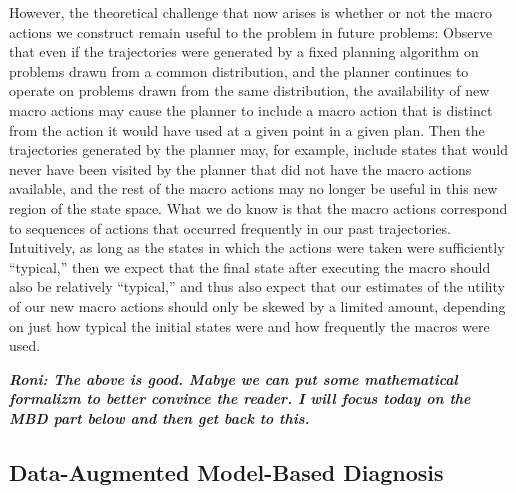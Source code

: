 \documentclass[12pt]{article}
\newcommand{\note}[1]{\textbf{\textit{#1}}}
\begin{document}
However, the theoretical challenge that now arises is whether or not the macro actions we construct remain useful to the problem in future problems: Observe that even if the trajectories were generated by a fixed planning algorithm on problems drawn from a common distribution, and the planner continues to operate on problems drawn from the same distribution, the availability of new macro actions may cause the planner to include a macro action that is distinct from the action it would have used at a given point in a given plan. Then the trajectories generated by the planner may, for example, include states that would never have been visited by the planner that did not have the macro actions available, and the rest of the macro actions may no longer be useful in this new region of the state space. What we do know is that the macro actions correspond to sequences of actions that occurred frequently in our past trajectories. Intuitively, as long as the states in which the actions were taken were sufficiently ``typical,'' then we expect that the final state after executing the macro should also be relatively ``typical,'' and thus also expect that our estimates of the utility of our new macro actions should only be skewed by a limited amount, depending on just how typical the initial states were and how frequently the macros were used.


\note{Roni: The above is good. Mabye we can put some mathematical formalizm to better convince the reader. I will focus today on the MBD part below and then get back to this.}







\subsection{Data-Augmented Model-Based Diagnosis}
\end{document}
